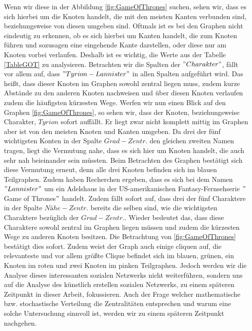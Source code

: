 Wenn wir diese in der Abbildung \ref{fig:GameOfThrones} suchen, sehen wir, dass es sich hierbei um die Knoten handelt, die mit den meisten Kanten verbunden sind, beziehungsweise von diesen umgeben sind. Oftmals ist es bei den Graphen nicht eindeutig zu erkennen, ob es sich hierbei um Kanten handelt, die zum Knoten führen und sozusagen eine eingehende Kante darstellen, oder diese nur am Knoten vorbei verlaufen. Deshalb ist es wichtig, die Werte aus der Tabelle \ref{TableGOT} zu analysieren. Betrachten wir die Spalten der $"Charakter"$, fällt vor allem auf, dass $"Tyrion -Lannister"$ in allen  Spalten aufgeführt wird. Das heißt, dass dieser Knoten im Graphen sowohl zentral liegen muss, zudem kurze Abstände zu den anderen Knoten nachweisen und über diesen Knoten verlaufen zudem die häufigsten kürzesten Wege. Werfen wir nun einen Blick auf den Graphen \ref{fig:GameOfThrones}, so sehen wir, dass der Knoten, beziehungsweise Charakter, $Tyrion$  sofort auffällt. Er liegt zwar nicht komplett mittig im Graphen aber ist von den meisten Knoten und Kanten umgeben. Da drei der fünf wichtigsten Konten  in der Spalte $Grad-Zentr.$ den gleichen zweiten Namen tragen, liegt die Vermutung nahe, dass es sich hier um Knoten handelt, die auch sehr nah beieinander sein müssten. Beim Betrachten des Graphen bestätigt sich diese Vermutung erneut, denn alle drei Knoten befinden sich im blauen Teilgraphen. Zudem haben Recherchen ergeben, dass es sich bei dem Namen $"Lannister"$ um ein Adelshaus in der US-amerikanischen Fantasy-Fernsehserie $"$Game of Thrones$"$ handelt. Zudem fällt sofort auf, dass drei der fünf Charaktere in der Spalte $Nähe-Zentr.$ bereits die selben sind, wie die wichtigsten Charaktere bezüglich der $Grad-Zentr.$. Wieder bedeutet das, dass diese Charaktere sowohl zentral im Graphen liegen müssen und zudem die kürzesten Wege zu anderen Knoten besitzen. Die Betrachtung von \ref{fig:GameOfThrones} bestätigt dies sofort. Zudem weist der Graph auch einige cliquen auf, die relevanteste und vor allem größte Clique befindet sich im blauen, grünen, ein Knoten im roten und zwei Knoten im pinken Teilgraphen. Jedoch werden wir die Analyse dieses interessanten sozialen Netzwerks nicht weiterführen, sondern uns auf die Analyse des künstlich erstellen sozialen Netzwerks, zu einem späteren Zeitpunkt in dieser Arbeit, fokussieren. Auch der Frage welcher mathematische bzw. stochastische Verteilung die Zentralitäten entsprechen und warum eine solche Untersuchung sinnvoll ist, werden wir zu einem späteren Zeitpunkt nachgehen.


